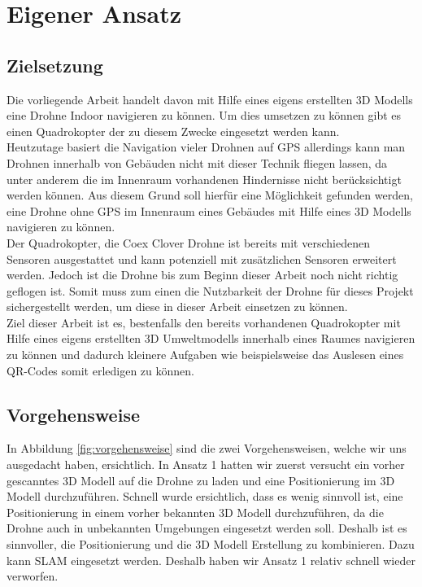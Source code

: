 \chapter{Eigener Ansatz}

\section{Zielsetzung}
Die vorliegende Arbeit handelt davon mit Hilfe eines eigens erstellten 3D Modells eine Drohne Indoor navigieren zu können. Um dies umsetzen zu können gibt es einen Quadrokopter der zu diesem Zwecke eingesetzt werden kann. \\
Heutzutage basiert die Navigation vieler Drohnen auf \ac{GPS} allerdings kann man Drohnen innerhalb von Gebäuden nicht mit dieser Technik fliegen lassen, da unter anderem die im Innenraum vorhandenen Hindernisse nicht berücksichtigt werden können. Aus diesem Grund soll hierfür eine Möglichkeit gefunden werden, eine Drohne ohne \ac{GPS} im Innenraum eines Gebäudes mit Hilfe eines 3D Modells navigieren zu können.\\
Der Quadrokopter, die Coex Clover Drohne ist bereits mit verschiedenen Sensoren ausgestattet und kann potenziell mit zusätzlichen Sensoren erweitert werden. Jedoch ist die Drohne bis zum Beginn dieser Arbeit noch nicht richtig geflogen ist. Somit muss zum einen die Nutzbarkeit der Drohne für dieses Projekt sichergestellt werden, um diese in dieser Arbeit einsetzen zu können. \\
Ziel dieser Arbeit ist es, bestenfalls den bereits vorhandenen Quadrokopter mit Hilfe eines eigens erstellten 3D Umweltmodells innerhalb eines Raumes navigieren zu können und dadurch kleinere Aufgaben wie beispielsweise das Auslesen eines QR-Codes somit erledigen zu können.



\section{Vorgehensweise}

In Abbildung \ref{fig:vorgehensweise} sind die zwei Vorgehensweisen, welche wir uns ausgedacht haben, ersichtlich. In Ansatz 1 hatten wir zuerst versucht ein vorher gescanntes 3D Modell auf die Drohne zu laden und eine Positionierung im 3D Modell durchzuführen. Schnell wurde ersichtlich, dass es wenig sinnvoll ist, eine Positionierung in einem vorher bekannten 3D Modell durchzuführen, da die Drohne auch in unbekannten Umgebungen eingesetzt werden soll. Deshalb ist es sinnvoller, die Positionierung und die 3D Modell Erstellung zu kombinieren. Dazu kann \ac{SLAM} eingesetzt werden. Deshalb haben wir Ansatz 1 relativ schnell wieder verworfen.

